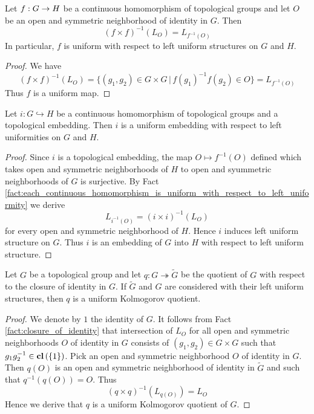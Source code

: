 \documentclass[10pt]{amsart}
\begin{document}
\begin{fact}\label{fact:each_continuous_homomorphism_is_uniform_with_respect_to_left_uniformity}
	Let $f:G\rightarrow H$ be a continuous homomorphism of topological groups and let $O$ be an open and symmetric neighborhood of identity in $G$. Then
	$$\left(f\times f\right)^{-1}(L_O) = L_{f^{-1}(O)}$$
	In particular, $f$ is uniform with respect to left uniform structures on $G$ and $H$.
\end{fact}
\begin{proof}
	We have
	$$\left(f\times f\right)^{-1}(L_O) = \big\{(g_1, g_2) \in G\times G\,\big|\,f(g_1)^{-1}f(g_2) \in O\big\} = L_{f^{-1}(O)}$$
	Thus $f$ is a uniform map.
\end{proof}

\begin{corollary}\label{corollary:topological_groups_embeddings_is_uniform_embedding}
	Let $i:G\hookrightarrow H$ be a continuous homomorphism of topological groups and a topological embedding. Then $i$ is a uniform embedding with respect to left uniformities on $G$ and $H$.
\end{corollary}
\begin{proof}
	Since $i$ is a topological embedding, the map $O\mapsto f^{-1}(O)$ defined which takes open and symmetric neighborhoods of $H$ to open and syummetric neighborhoods of $G$ is surjective. By Fact \ref{fact:each_continuous_homomorphism_is_uniform_with_respect_to_left_uniformity} we derive
	$$L_{i^{-1}(O)} = \left(i\times i\right)^{-1}(L_O)$$
	for every open and symmetric neighborhood of $H$. Hence $i$ induces left uniform structure on $G$. Thus $i$ is an embedding of $G$ into $H$ with respect to left uniform structure.
\end{proof}

\begin{corollary}\label{corollary:uniform_Kolmogorov_quotients_of_topological_groups}
	Let $G$ be a topological group and let $q:G\twoheadrightarrow \tilde{G}$ be the quotient of $G$ with respect to the closure of identity in $G$. If $\tilde{G}$ and $G$ are considered with their left uniform structures, then $q$ is a uniform Kolmogorov quotient.
\end{corollary}
\begin{proof}
	We denote by $1$ the identity of $G$. It follows from Fact \ref{fact:closure_of_identity} that intersection of $L_O$ for all open and symmetric neighborhoods $O$ of identity in $G$ consists of $(g_1,g_2) \in G\times G$ such that $g_1g_2^{-1} \in \mathbf{cl}\left(\{1\}\right)$. Pick an open and symmetric neighborhood $O$ of identity in $G$. Then $q(O)$ is an open and symmetric neighborhood of identity in $\tilde{G}$ and such that $q^{-1}(q(O)) = O$. Thus
	$$\left(q \times q\right)^{-1}(L_{q(O)}) = L_O$$
	Hence we derive that $q$ is a uniform Kolmogorov quotient of $G$.
\end{proof}
\end{document}
